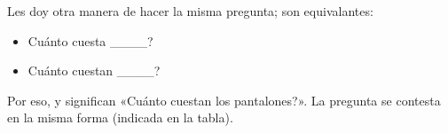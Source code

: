 Les doy otra manera de hacer la misma pregunta; son equivalantes:
\begin{itemize}
	\item \textquestiondown Cu\'anto cuesta \_\_\_\_? \arr {}
	\item \textquestiondown Cu\'anto cuestan \_\_\_\_? \arr {}
\end{itemize}

Por eso,  y 
significan «\textquestiondown Cu\'anto cuestan los pantalones?».
La pregunta se contesta en la misma forma (indicada en la tabla).
